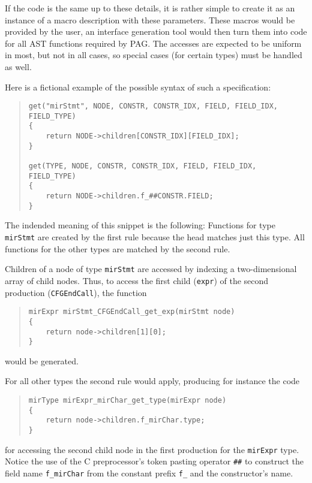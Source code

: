 \documentclass[12pt]{article}
\begin{document}
If the code is the same up to these details, it is rather simple to
create it as an instance of a macro description with these
parameters. These macros would be provided by the user, an interface
generation tool would then turn them into code for all AST functions
required by PAG. The accesses are expected to be uniform in most,
but not in all cases, so special cases (for certain types) must be
handled as well.

Here is a fictional example of the possible syntax of such a
specification:

\begin{quote}
\begin{verbatim}
get("mirStmt", NODE, CONSTR, CONSTR_IDX, FIELD, FIELD_IDX, FIELD_TYPE)
{
    return NODE->children[CONSTR_IDX][FIELD_IDX];
}

get(TYPE, NODE, CONSTR, CONSTR_IDX, FIELD, FIELD_IDX, FIELD_TYPE)
{
    return NODE->children.f_##CONSTR.FIELD;
}
\end{verbatim}
\end{quote}

The indended meaning of this snippet is the following: Functions for
type \verb|mirStmt| are created by the first rule because the head
matches just this type. All functions for the other types are
matched by the second rule.

Children of a node of type \verb|mirStmt| are accessed by indexing a
two-dimensional array of child nodes. Thus, to access the first
child (\verb|expr|) of the second production (\verb|CFGEndCall|),
the function
\begin{quote}
\begin{verbatim} 
mirExpr mirStmt_CFGEndCall_get_exp(mirStmt node)
{
    return node->children[1][0];
}
\end{verbatim}
\end{quote}
would be generated.

For all other types the second rule would apply, producing for
instance the code
\begin{quote}
\begin{verbatim}
mirType mirExpr_mirChar_get_type(mirExpr node)
{
    return node->children.f_mirChar.type;
}
\end{verbatim}
\end{quote}
for accessing the second child node in the first production for the
\verb|mirExpr| type.
Notice the use of the C preprocessor's token pasting operator
\verb|##| to construct the field name \verb|f_mirChar| from the
constant prefix \verb|f_| and the constructor's name.
\end{document}
